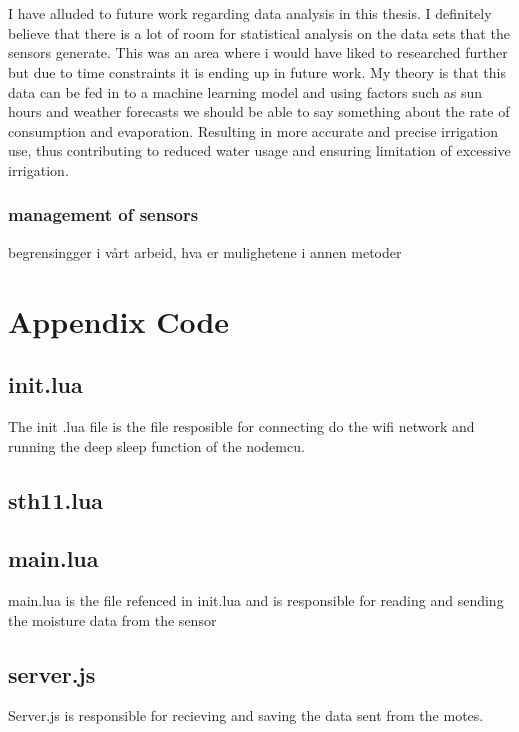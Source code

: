 \documentclass[]{uiophd}
\begin{document}
\\\\
I have alluded to future work regarding data analysis in this thesis. I definitely believe that there is a lot of room for statistical analysis on the data sets that the sensors generate. This was an area where i would have liked to researched further but due to time constraints it is ending up in future work. My theory is that this data can be fed in to a machine learning model and using factors such as sun hours and weather forecasts we should be able to say something about the rate of consumption and evaporation. Resulting in more accurate and precise irrigation use, thus contributing to reduced water usage and ensuring limitation of excessive irrigation.

\subsection{management of sensors}
begrensingger i vårt arbeid, hva er mulighetene i annen metoder

\chapter{Appendix Code}
\linespread{1}

\section{init.lua}
The init .lua file is the file resposible for connecting do the wifi network and running the deep sleep function of the nodemcu.


\section{sth11.lua}


\section{main.lua}
main.lua is the file refenced in init.lua and is responsible for reading and sending the moisture data from the sensor


\section{server.js}
Server.js is responsible for recieving and saving the data sent from the motes.

\end{document}
